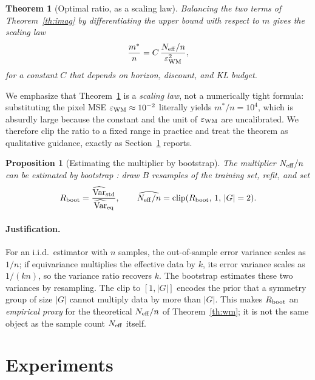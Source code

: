 \documentclass[sigconf,anonymous]{acmart}
\newtheorem{theorem}{Theorem}
\newtheorem{proposition}{Proposition}
\begin{document}
\begin{theorem}[Optimal ratio, as a scaling law]\label{th:ratio}
Balancing the two terms of Theorem~\ref{th:imag} by differentiating the upper
bound with respect to $m$ gives the scaling law
\begin{equation}
  \frac{m^*}{n}=C\,\frac{N_{\rm eff}/n}{\varepsilon_{\rm WM}^{2}},
\end{equation}
for a constant $C$ that depends on horizon, discount, and KL budget.
\end{theorem}

We emphasize that Theorem~\ref{th:ratio} is a \emph{scaling law}, not a
numerically tight formula: substituting the pixel MSE
$\varepsilon_{\rm WM}\approx10^{-2}$ literally yields $m^*/n=10^4$, which is
absurdly large because the constant and the unit of $\varepsilon_{\rm WM}$
are uncalibrated. We therefore clip the ratio to a fixed range in practice
and treat the theorem as qualitative guidance, exactly as
Section~\ref{sec:exp} reports.

\begin{proposition}[Estimating the multiplier by bootstrap]\label{prop:meff}
The multiplier $N_{\rm eff}/n$ can be estimated by bootstrap
\cite{bootstrap1993}: draw $B$ resamples of the training set, refit, and set
\begin{equation}
  R_{\rm boot}=\frac{\widehat{\operatorname{Var}}_{\rm std}}{\widehat{\operatorname{Var}}_{\rm eq}},
  \qquad
  \widehat{N_{\rm eff}/n}=\operatorname{clip}(R_{\rm boot},\,1,\,|G|=2).
\end{equation}
\end{proposition}

\paragraph{Justification.}
For an i.i.d.\ estimator with $n$ samples, the out-of-sample error variance
scales as $1/n$; if equivariance multiplies the effective data by $k$, its
error variance scales as $1/(kn)$, so the variance ratio recovers $k$. The
bootstrap \cite{bootstrap1993} estimates these two variances by resampling.
The clip to $[1,|G|]$ encodes the prior that a symmetry group of size $|G|$
cannot multiply data by more than $|G|$. This makes $R_{\rm boot}$ an
\emph{empirical proxy} for the theoretical $N_{\rm eff}/n$ of
Theorem~\ref{th:wm}; it is not the same object as the sample count $N_{\rm eff}$ itself.

\section{Experiments}\label{sec:exp}
\end{document}
